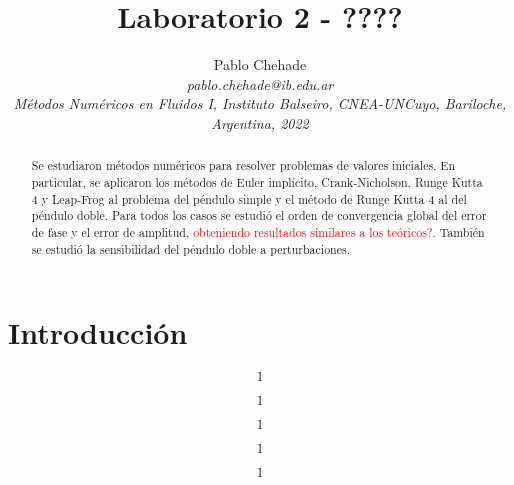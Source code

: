 \documentclass[aps,prb,twocolumn,superscriptaddress,floatfix,longbibliography]{revtex4-2}
\newcounter{para}
\begin{document}
\newcommand{\mytitle}{Laboratorio 2 - ????}

\title{\mytitle}

\author{Pablo Chehade \\
    \small \textit{pablo.chehade@ib.edu.ar} \\
    \small \textit{Métodos Numéricos en Fluidos I, Instituto Balseiro, CNEA-UNCuyo, Bariloche, Argentina, 2022} \\}


\begin{abstract}

Se estudiaron métodos numéricos para resolver problemas de valores iniciales. En particular, se aplicaron los métodos de Euler implícito, Crank-Nicholson, Runge Kutta 4 y Leap-Frog al problema del péndulo simple y el método de Runge Kutta 4 al del péndulo doble. Para todos los casos se estudió el orden de convergencia global del error de fase y el error de amplitud, \textcolor{red}{obteniendo resultados similares a los teóricos?}. También se estudió la sensibilidad del péndulo doble a perturbaciones.

\end{abstract}

\maketitle

\section{Introducción}

\begin{equation}
  1
  \label{eq:pendulo_simple}
\end{equation}

\begin{equation}
  1
  \label{eq:periodo_simple}
\end{equation}


\begin{equation}
  1
  \label{eq:fase_simple}
\end{equation}

\begin{equation}
  1
  \label{eq:amplitud_simple}
\end{equation}


\begin{equation}
  1
  \label{eq:pendulo_doble}
\end{equation}
\end{document}
